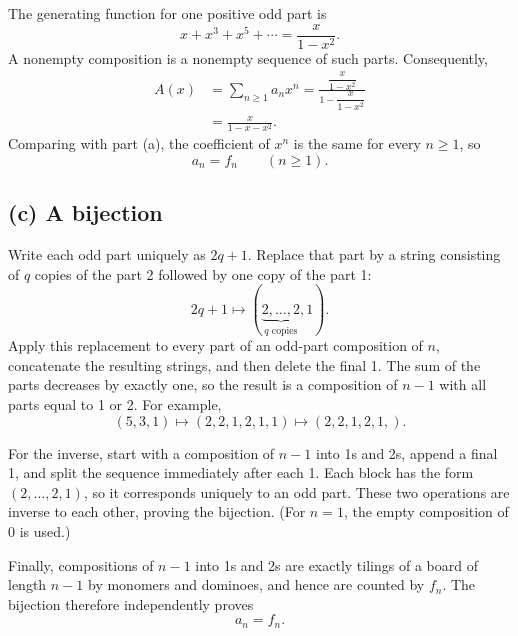 \documentclass[11pt]{article}
\begin{document}
The generating function for one positive odd part is
\[
    x+x^3+x^5+\cdots=\frac{x}{1-x^2}.
\]
A nonempty composition is a nonempty sequence of such parts. Consequently,
\begin{align*}
    A(x)&=\sum_{n\geq1}a_nx^n
    =\frac{\dfrac{x}{1-x^2}}{1-\dfrac{x}{1-x^2}}\\
    &=\boxed{\frac{x}{1-x-x^2}}.
\end{align*}
Comparing with part (a), the coefficient of \(x^n\) is the same for every
\(n\geq1\), so
\[
    \boxed{a_n=f_n\qquad(n\geq1).}
\]

\subsection*{(c) A bijection}

Write each odd part uniquely as \(2q+1\). Replace that part by a string
consisting of \(q\) copies of the part 2 followed by one copy of the part 1:
\[
    2q+1\longmapsto (\underbrace{2,\ldots,2}_{q\text{ copies}},1).
\]
Apply this replacement to every part of an odd-part composition of \(n\),
concatenate the resulting strings, and then delete the final 1. The sum of
the parts decreases by exactly one, so the result is a composition of
\(n-1\) with all parts equal to 1 or 2. For example,
\[
    (5,3,1)\longmapsto (2,2,1,2,1,1)\longmapsto(2,2,1,2,1,).
\]

For the inverse, start with a composition of \(n-1\) into 1s and 2s, append
a final 1, and split the sequence immediately after each 1. Each block has
the form \((2,\ldots,2,1)\), so it corresponds uniquely to an odd part. These
two operations are inverse to each other, proving the bijection. (For \(n=1\),
the empty composition of 0 is used.)

Finally, compositions of \(n-1\) into 1s and 2s are exactly tilings of a
board of length \(n-1\) by monomers and dominoes, and hence are counted by
\(f_n\). The bijection therefore independently proves
\[
    a_n=f_n.
\]
\end{document}
